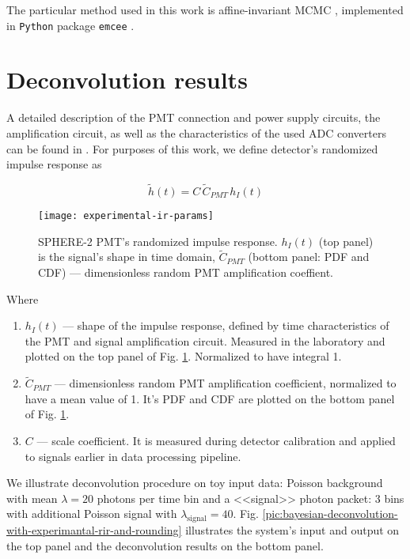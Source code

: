 The particular method used in this work is affine-invariant MCMC \cite{Goodman2010}, implemented in \verb|Python| package \verb|emcee| \cite{ForemanMackey2016}.

\section{Deconvolution results}

A detailed description of the PMT connection and power supply circuits, the amplification circuit, as well as the characteristics of the used ADC converters can be found in \cite{SphereDetector2020}. For purposes of this work, we define detector's randomized impulse response as 

\begin{equation}
	\label{eq:experimental-rir}
	\tilde{h}(t) = C \, \tilde{C}_{PMT} \, h_I(t)
\end{equation}

\begin{figure}
	\centering
	\texttt{[image: experimental-ir-params]}
	\caption{SPHERE-2 PMT's randomized impulse response. $h_I(t)$ (top panel) is the signal's shape in time domain, $\tilde{C}_{PMT}$ (bottom panel: PDF and CDF) --- dimensionless random PMT amplification coeffient.}
	\label{pic:experimental-rir-params}
\end{figure}

Where

\begin{enumerate}
	\item $h_I(t)$ --- shape of the impulse response, defined by time characteristics of the PMT and signal amplification circuit. Measured in the laboratory and plotted on the top panel of Fig. \ref{pic:experimental-rir-params}. Normalized to have integral 1.
	\item $\tilde{C}_{PMT}$ --- dimensionless random PMT amplification coefficient, normalized to have a mean value of 1. It's PDF and CDF are plotted on the bottom panel of Fig. \ref{pic:experimental-rir-params}.
	\item $C$ --- scale coefficient. It is measured during detector calibration and applied to signals earlier in data processing pipeline.
\end{enumerate}

We illustrate deconvolution procedure on toy input data: Poisson background with mean $\lambda=20$ photons per time bin and a <<signal>> photon packet: 3 bins with additional Poisson signal with $\lambda_{\mathrm{signal}}=40$. Fig. \ref{pic:bayesian-deconvolution-with-experimantal-rir-and-rounding} illustrates the system's input and output on the top panel and the deconvolution results on the bottom panel.


